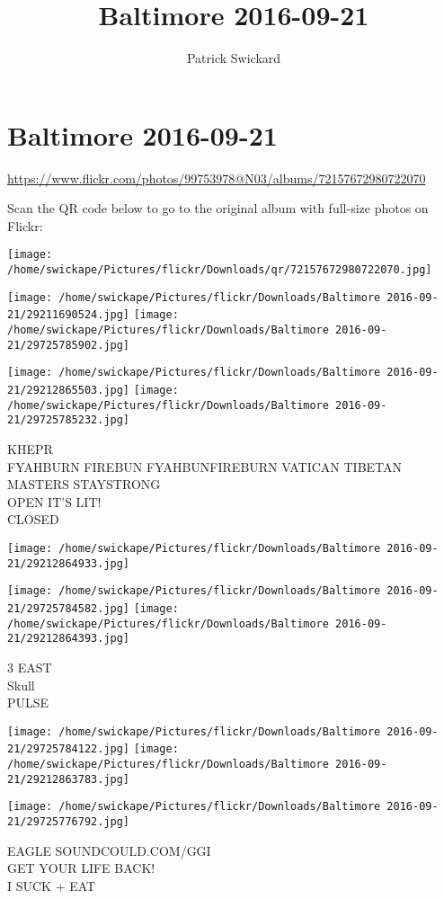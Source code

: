 \documentclass[10pt,letterpaper]{article}
\title{Baltimore 2016-09-21}
\author{Patrick Swickard}
\date{}
\begin{document}
\section*{Baltimore 2016-09-21}

\url{https://www.flickr.com/photos/99753978@N03/albums/72157672980722070}

Scan the QR code below to go to the original album with full-size photos on Flickr:

\texttt{[image: /home/swickape/Pictures/flickr/Downloads/qr/72157672980722070.jpg]}
\pagebreak

\texttt{[image: /home/swickape/Pictures/flickr/Downloads/Baltimore 2016-09-21/29211690524.jpg]}
\texttt{[image: /home/swickape/Pictures/flickr/Downloads/Baltimore 2016-09-21/29725785902.jpg]}

\texttt{[image: /home/swickape/Pictures/flickr/Downloads/Baltimore 2016-09-21/29212865503.jpg]}
\texttt{[image: /home/swickape/Pictures/flickr/Downloads/Baltimore 2016-09-21/29725785232.jpg]}

KHEPR\\
FYAHBURN FIREBUN FYAHBUNFIREBURN VATICAN TIBETAN MASTERS STAYSTRONG\\
OPEN IT'S LIT!\\
CLOSED
\pagebreak

\texttt{[image: /home/swickape/Pictures/flickr/Downloads/Baltimore 2016-09-21/29212864933.jpg]}

\vspace{0.25in}
\texttt{[image: /home/swickape/Pictures/flickr/Downloads/Baltimore 2016-09-21/29725784582.jpg]}
\texttt{[image: /home/swickape/Pictures/flickr/Downloads/Baltimore 2016-09-21/29212864393.jpg]}

3 EAST\\
Skull\\
PULSE
\pagebreak

\texttt{[image: /home/swickape/Pictures/flickr/Downloads/Baltimore 2016-09-21/29725784122.jpg]}
\texttt{[image: /home/swickape/Pictures/flickr/Downloads/Baltimore 2016-09-21/29212863783.jpg]}

\vspace{0.25in}
\texttt{[image: /home/swickape/Pictures/flickr/Downloads/Baltimore 2016-09-21/29725776792.jpg]}

EAGLE SOUNDCOULD.COM/GGI\\
GET YOUR LIFE BACK!\\
I SUCK + EAT
\pagebreak
\end{document}
